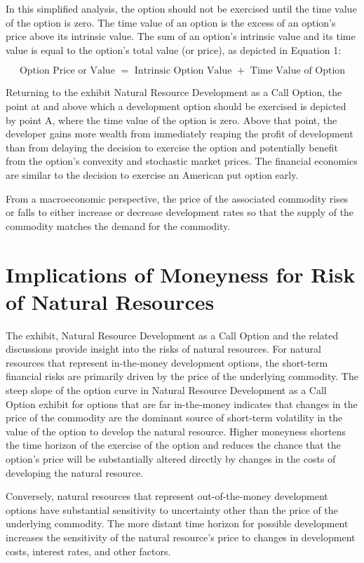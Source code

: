 \documentclass[11pt]{article}
\begin{document}
In this simplified analysis, the option should not be exercised until the time value of the option is zero. The time value of an option is the excess of an option's price above its intrinsic value. The sum of an option's intrinsic value and its time value is equal to the option's total value (or price), as depicted in Equation 1:


\begin{equation*}
\text { Option Price or Value }=\text { Intrinsic Option Value }+ \text { Time Value of Option } \tag{1}
\end{equation*}


Returning to the exhibit Natural Resource Development as a Call Option, the point at and above which a development option should be exercised is depicted by point A, where the time value of the option is zero. Above that point, the developer gains more wealth from immediately reaping the profit of development than from delaying the decision to exercise the option and potentially benefit from the option's convexity and stochastic market prices. The financial economics are similar to the decision to exercise an American put option early.

From a macroeconomic perspective, the price of the associated commodity rises or falls to either increase or decrease development rates so that the supply of the commodity matches the demand for the commodity.

\section*{Implications of Moneyness for Risk of Natural Resources}
The exhibit, Natural Resource Development as a Call Option and the related discussions provide insight into the risks of natural resources. For natural resources that represent in-the-money development options, the short-term financial risks are primarily driven by the price of the underlying commodity. The steep slope of the option curve in Natural Resource Development as a Call Option exhibit for options that are far in-the-money indicates that changes in the price of the commodity are the dominant source of short-term volatility in the value of the option to develop the natural resource. Higher moneyness shortens the time horizon of the exercise of the option and reduces the chance that the option's price will be substantially altered directly by changes in the costs of developing the natural resource.

Conversely, natural resources that represent out-of-the-money development options have substantial sensitivity to uncertainty other than the price of the underlying commodity. The more distant time horizon for possible development increases the sensitivity of the natural resource's price to changes in development costs, interest rates, and other factors.
\end{document}
